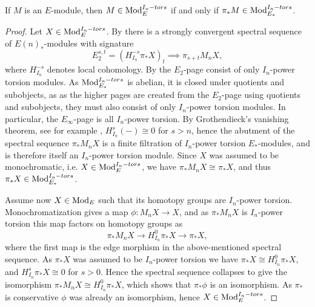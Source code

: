 \begin{lemma}
    \label{ch2:lm:monochromatic-iff-torsion-modules}
    If $M$ is an $E$-module, then $M\in \mathrm{Mod}_{E}^{I_n-tors}$ if and only if $\pi_* M\in \mathrm{Mod}_{E_*}^{I_n-tors}$. 
\end{lemma}
\begin{proof}
    Let $X\in \mathrm{Mod}_{E}^{I_n-tors}$. By \cite[3.19]{barthel-heard-valenzuela_2018} there is a strongly convergent spectral sequence of $E(n)_*$-modules with signature 
    $$E_2^{s,t} = (H_{I_n}^{-s}\pi_* X)_t \implies \pi_{s+t}M_n X,$$
    where $H_{I_n}^{-s}$ denotes local cohomology. By \cite[2.1.3(ii)]{brodmann-sharp_1998} the $E_2$-page consist of only $I_n$-power torsion modules. As $\mathrm{Mod}_{E_*}^{I_n-tors}$ is abelian, it is closed under quotients and subobjects, as as the higher pages are created from the $E_2$-page using quotients and subobjects, they must also consist of only $I_n$-power torsion modules. In particular, the $E_\infty$-page is all $I_n$-power torsion. By Grothendieck's vanishing theorem, see for example \cite[6.1.2]{brodmann-sharp_1998}, $H_{I_n}^s(-)\cong 0$ for $s>n$, hence the abutment of the spectral sequence $\pi_* M_n X$ is a finite filtration of $I_n$-power torsion $E_*$-modules, and is therefore itself an $I_n$-power torsion module. Since $X$ was assumed to be monochromatic, i.e. $X\in \mathrm{Mod}_{E}^{I_n-tors}$, we have $\pi_* M_n X\cong \pi_* X$, and thus $\pi_* X\in \mathrm{Mod}_{E_*}^{I_n-tors}$. 

    Assume now $X\in \mathrm{Mod}_{E}$ such that its homotopy groups are $I_n$-power torsion. Monochromatization gives a map $\phi\colon M_n X\longrightarrow X$, and as $\pi_*M_nX$ is $I_n$-power torsion this map factors on homotopy groups as 
    $$\pi_* M_n X\longrightarrow H^0_{I_n}\pi_* X\longrightarrow \pi_* X,$$
    where the first map is the edge morphism in the above-mentioned spectral sequence. As $\pi_* X$ was assumed to be $I_n$-power torsion we have $\pi_*X\cong H^0_{I_n}\pi_* X$, and $H^s_{I_n}\pi_* X \cong 0$ for $s>0$. Hence the spectral sequence collapses to give the isomorphism $\pi_* M_n X\cong H^0_{I_n}\pi_* X$, which shows that $\pi_* \phi$ is an isomorphism. As $\pi_*$ is conservative $\phi$ was already an isomorphism, hence $X\in \mathrm{Mod}_{E}^{I_n-tors}$. 
\end{proof}

